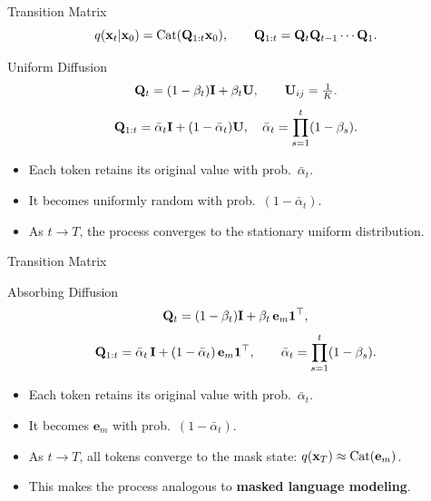 \documentclass{beamer}
\renewcommand{\eqpause}{}
\begin{document}
\begin{frame}{Transition Matrix}
	\[
		q(\mathbf{x}_t|\mathbf{x}_0) = \operatorname{Cat}(\mathbf{Q}_{1:t}\mathbf{x}_0),
		\qquad
		\mathbf{Q}_{1:t} = \mathbf{Q}_t \mathbf{Q}_{t-1} \cdots \mathbf{Q}_1.
	\]
	\eqpause
	\begin{block}{Uniform Diffusion}
		\[
			\mathbf{Q}_t = (1-\beta_t)\mathbf{I} + \beta_t \mathbf{U},
			\qquad
			\mathbf{U}_{ij} = \tfrac{1}{K}.
		\]
		\[
			\mathbf{Q}_{1:t} = \bar\alpha_t\mathbf{I} + (1 - \bar\alpha_t) \mathbf{U},
			\quad
			\bar\alpha_t = \prod_{s=1}^t (1-\beta_s).
		\]
		\eqpause
		\begin{itemize}
			\item Each token retains its original value with prob.~$\bar\alpha_t$.
			\item It becomes uniformly random with prob.~$(1 - \bar\alpha_t)$.
			\item As $t \to T$, the process converges to the stationary uniform distribution.
		\end{itemize}
	\end{block}
\end{frame}
\begin{frame}{Transition Matrix}

	\begin{block}{Absorbing Diffusion}
		\[
			\mathbf{Q}_t = (1-\beta_t)\mathbf{I} + \beta_t\, \mathbf{e}_m \mathbf{1}^\top,
		\]
		\[
			\mathbf{Q}_{1:t} = \bar\alpha_t\,\mathbf{I} + (1-\bar\alpha_t)\,\mathbf{e}_m \mathbf{1}^\top,
			\qquad
			\bar\alpha_t = \prod_{s=1}^t (1-\beta_s).
		\]
		\eqpause
		\begin{itemize}
			\item Each token retains its original value with prob.~$\bar\alpha_t$.
			\item It becomes $\mathbf{e}_m$ with prob.~$(1 - \bar\alpha_t)$.
			\item As $t \to T$, all tokens converge to the mask state: $q(\mathbf{x}_T) \approx \operatorname{Cat}(\mathbf{e}_m)$.
			\item This makes the process analogous to \textbf{masked language modeling}.
		\end{itemize}
	\end{block}
\end{frame}
\end{document}
